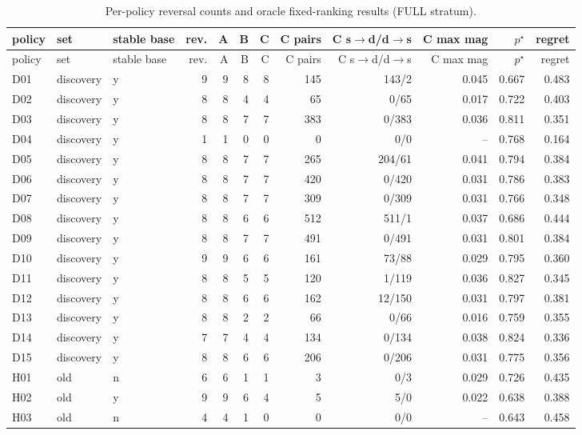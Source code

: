 \documentclass[10pt,a4paper]{article}
\begin{document}
{\tiny
\begin{longtable}{lllrrrrrrrrr}
\caption{Per-policy reversal counts and oracle fixed-ranking results (FULL stratum).}\label{tab:s-census}\\
\toprule
policy & set & stable base & rev. & A & B & C & C pairs & C s$\to$d/d$\to$s & C max mag & $p^\star$ & regret \\
\midrule
\endfirsthead
\toprule
policy & set & stable base & rev. & A & B & C & C pairs & C s$\to$d/d$\to$s & C max mag & $p^\star$ & regret \\
\midrule
\endhead
D01 & discovery & y & 9 & 9 & 8 & 8 & 145 & 143/2 & 0.045 & 0.667 & 0.483 \\
D02 & discovery & y & 8 & 8 & 4 & 4 & 65 & 0/65 & 0.017 & 0.722 & 0.403 \\
D03 & discovery & y & 8 & 8 & 7 & 7 & 383 & 0/383 & 0.036 & 0.811 & 0.351 \\
D04 & discovery & y & 1 & 1 & 0 & 0 & 0 & 0/0 & -- & 0.768 & 0.164 \\
D05 & discovery & y & 8 & 8 & 7 & 7 & 265 & 204/61 & 0.041 & 0.794 & 0.384 \\
D06 & discovery & y & 8 & 8 & 7 & 7 & 420 & 0/420 & 0.031 & 0.786 & 0.383 \\
D07 & discovery & y & 8 & 8 & 7 & 7 & 309 & 0/309 & 0.031 & 0.766 & 0.348 \\
D08 & discovery & y & 8 & 8 & 6 & 6 & 512 & 511/1 & 0.037 & 0.686 & 0.444 \\
D09 & discovery & y & 8 & 8 & 7 & 7 & 491 & 0/491 & 0.031 & 0.801 & 0.384 \\
D10 & discovery & y & 9 & 9 & 6 & 6 & 161 & 73/88 & 0.029 & 0.795 & 0.360 \\
D11 & discovery & y & 8 & 8 & 5 & 5 & 120 & 1/119 & 0.036 & 0.827 & 0.345 \\
D12 & discovery & y & 8 & 8 & 6 & 6 & 162 & 12/150 & 0.031 & 0.797 & 0.381 \\
D13 & discovery & y & 8 & 8 & 2 & 2 & 66 & 0/66 & 0.016 & 0.759 & 0.355 \\
D14 & discovery & y & 7 & 7 & 4 & 4 & 134 & 0/134 & 0.038 & 0.824 & 0.336 \\
D15 & discovery & y & 8 & 8 & 6 & 6 & 206 & 0/206 & 0.031 & 0.775 & 0.356 \\
H01 & old & n & 6 & 6 & 1 & 1 & 3 & 0/3 & 0.029 & 0.726 & 0.435 \\
H02 & old & y & 9 & 9 & 6 & 4 & 5 & 5/0 & 0.022 & 0.638 & 0.388 \\
H03 & old & n & 4 & 4 & 1 & 0 & 0 & 0/0 & -- & 0.643 & 0.458 \\

\end{longtable}}
\end{document}
